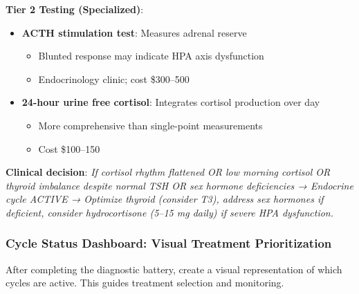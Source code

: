\textbf{Tier 2 Testing (Specialized)}:
\begin{itemize}
    \item \textbf{ACTH stimulation test}: Measures adrenal reserve
    \begin{itemize}
        \item Blunted response may indicate HPA axis dysfunction
        \item Endocrinology clinic; cost \$300--500
    \end{itemize}

    \item \textbf{24-hour urine free cortisol}: Integrates cortisol production over day
    \begin{itemize}
        \item More comprehensive than single-point measurements
        \item Cost \$100--150
    \end{itemize}
\end{itemize}

\textbf{Clinical decision}: \textit{If cortisol rhythm flattened OR low morning cortisol OR thyroid imbalance despite normal TSH OR sex hormone deficiencies → Endocrine cycle ACTIVE → Optimize thyroid (consider T3), address sex hormones if deficient, consider hydrocortisone (5--15 mg daily) if severe HPA dysfunction.}

\subsubsection{Cycle Status Dashboard: Visual Treatment Prioritization}

After completing the diagnostic battery, create a visual representation of which cycles are active. This guides treatment selection and monitoring.

